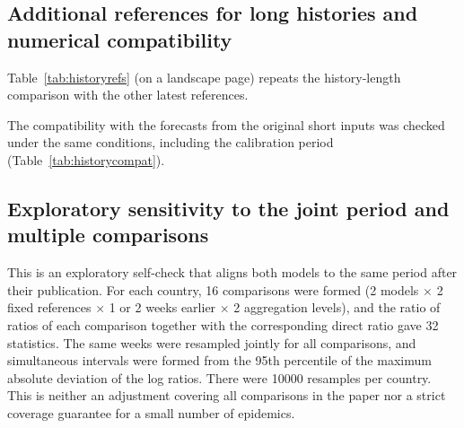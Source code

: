 \documentclass[11pt]{article}
\newcommand{\gentable}[1]{\adjustbox{max width=\linewidth}{}}
\begin{document}
\subsection{Additional references for long histories and numerical compatibility}\label{app:historyrefs}

Table~\ref{tab:historyrefs} (on a landscape page) repeats the history-length comparison with the other latest references.

\begin{table}\centering\small
\caption{History length with further latest references (exploratory). The long/short loss ratios of the numerator and denominator for all references were also saved. The pooled model is a supplementary reference with the existing latest 104-week features and trained models kept fixed, so the history lengths of the two sides are not matched. Classical components that use a fixed recent window keep that window.}\label{tab:historyrefs}
\end{table}

The compatibility with the forecasts from the original short inputs was checked under the same conditions, including the calibration period (Table~\ref{tab:historycompat}).

\begin{table}[H]\centering\small
\caption{Numerical compatibility of the new short-input forecasts with the original forecasts. This is a numerical check by the same researcher, not an independent reproduction, and it includes differences in batching between models and in the TimesFM inference setting. The main results were not overwritten with the new forecasts. The maximum of 256 weeks is a fixed sensitivity condition and does not guarantee an optimal history length or the use of all available history.}\label{tab:historycompat}
\gentable{tab_history_compat}
\end{table}

\subsection{Exploratory sensitivity to the joint period and multiple comparisons}\label{app:joint}

This is an exploratory self-check that aligns both models to the same period after their publication. For each country, 16 comparisons were formed (2 models $\times$ 2 fixed references $\times$ 1 or 2 weeks earlier $\times$ 2 aggregation levels), and the ratio of ratios of each comparison together with the corresponding direct ratio gave 32 statistics. The same weeks were resampled jointly for all comparisons, and simultaneous intervals were formed from the 95th percentile of the maximum absolute deviation of the log ratios. There were 10000 resamples per country. This is neither an adjustment covering all comparisons in the paper nor a strict coverage guarantee for a small number of epidemics.
\end{document}
